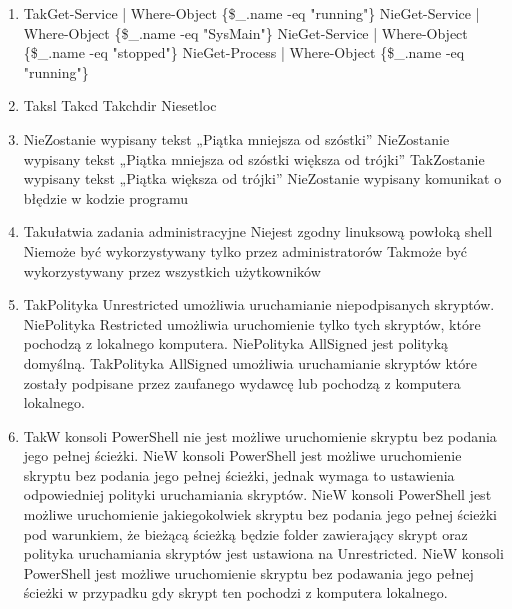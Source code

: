 \begin{enumerate}
		{Nie}{Zmienne nie mogą mieć zakresów widoczności}%
		{Tak}{Wszystkie zmienne są obiektami .NET}
		\item {}%
		{Tak}{Get-Service | Where-Object \{\$\_.name -eq "running"\}}%
		{Nie}{Get-Service | Where-Object \{\$\_.name -eq "SysMain"\}}%
		{Nie}{Get-Service | Where-Object \{\$\_.name -eq "stopped"\}}%
		{Nie}{Get-Process | Where-Object \{\$\_.name -eq "running"\}}
		\item {}%
		{Tak}{sl}%
		{Tak}{cd}%
		{Tak}{chdir}%
		{Nie}{setloc}
		\item {}%
		{Nie}{Zostanie wypisany tekst „Piątka mniejsza od szóstki”}%
		{Nie}{Zostanie wypisany tekst „Piątka mniejsza od szóstki większa od trójki”}%
		{Tak}{Zostanie wypisany tekst „Piątka większa od trójki”}%
		{Nie}{Zostanie wypisany komunikat o błędzie w kodzie programu}
		\item {}%
		{Tak}{ułatwia zadania administracyjne}%
		{Nie}{jest zgodny linuksową powłoką shell}%
		{Nie}{może być wykorzystywany tylko przez administratorów}%
		{Tak}{może być wykorzystywany przez wszystkich użytkowników}
		\item {}%
		{Tak}{Polityka Unrestricted umożliwia uruchamianie niepodpisanych skryptów.}%
		{Nie}{Polityka Restricted umożliwia uruchomienie tylko tych skryptów, które pochodzą z lokalnego komputera.}%
		{Nie}{Polityka AllSigned jest polityką domyślną.}%
		{Tak}{Polityka AllSigned umożliwia uruchamianie skryptów które zostały podpisane przez zaufanego wydawcę lub pochodzą z komputera lokalnego.}
		\item {}%
		{Tak}{W konsoli PowerShell nie jest możliwe uruchomienie skryptu bez podania jego pełnej ścieżki.}%
		{Nie}{W konsoli PowerShell jest możliwe uruchomienie skryptu bez podania jego pełnej ścieżki, jednak wymaga to ustawienia odpowiedniej polityki uruchamiania skryptów.}%
		{Nie}{W konsoli PowerShell jest możliwe uruchomienie jakiegokolwiek skryptu bez podania jego pełnej ścieżki pod warunkiem, że bieżącą ścieżką będzie folder zawierający skrypt oraz polityka uruchamiania skryptów jest ustawiona na Unrestricted.}%
		{Nie}{W konsoli PowerShell jest możliwe uruchomienie skryptu bez podawania jego pełnej ścieżki w przypadku gdy skrypt ten pochodzi z komputera lokalnego.}
		

\end{enumerate}
